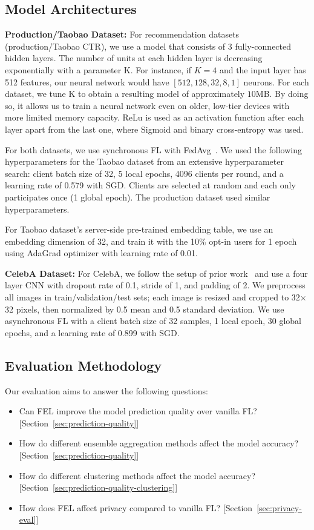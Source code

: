 \documentclass{article}
\begin{document}
\subsection{Model Architectures}
{\bf Production/Taobao Dataset:}
For recommendation datasets (production/Taobao CTR), we use a model that consists of 3 fully-connected hidden layers. The number of units at each hidden layer is decreasing exponentially with a parameter K. For instance, if $K=4$ and the input layer has 512 features, our neural network would have  $[512, 128, 32, 8, 1]$ neurons. For each dataset, we tune K to obtain a resulting model of approximately $10$MB. By doing so, it allows us to train a neural network even on older, low-tier devices with more limited memory capacity. ReLu is used as an activation function after each layer apart from the last one, where Sigmoid and binary cross-entropy was used.

For both datasets, we use synchronous FL with FedAvg~\cite{mcmahan2017learning}. We used the following hyperparameters for the Taobao dataset from an extensive hyperparameter search: client batch size of 32, 5 local epochs, 4096 clients per round, and a learning rate of 0.579 with SGD. Clients are selected at random and each only participates once (1 global epoch). The production dataset used similar hyperparameters.

For Taobao dataset's server-side pre-trained embedding table, we use an embedding dimension of 32, and train it with the 10\% opt-in users for 1 epoch using AdaGrad optimizer with learning rate of 0.01.

{\bf CelebA Dataset:}
For CelebA, we follow the setup of prior work~\cite{nguyen2021federated} and use a four layer CNN with dropout rate of 0.1, stride of 1, and padding of 2. We preprocess all images in train/validation/test sets; each image is resized and cropped to 32$\times$32 pixels, then normalized by 0.5 mean and 0.5 standard deviation. We use asynchronous FL with a client batch size of 32 samples, 1 local epoch, 30 global epochs, and a learning rate of 0.899 with SGD.

\subsection{Evaluation Methodology}
\label{sec:appendix-b}
Our evaluation aims to answer the following questions:

\begin{itemize}
    \item Can FEL improve the model prediction quality over vanilla FL? [Section~\ref{sec:prediction-quality}]
    \item How do different ensemble aggregation methods affect the model accuracy? [Section~\ref{sec:prediction-quality}]
    \item How do different clustering methods affect the model accuracy? [Section~\ref{sec:prediction-quality-clustering}]
    \item How does FEL affect privacy compared to vanilla FL? [Section~\ref{sec:privacy-eval}]
\end{itemize}
\end{document}
